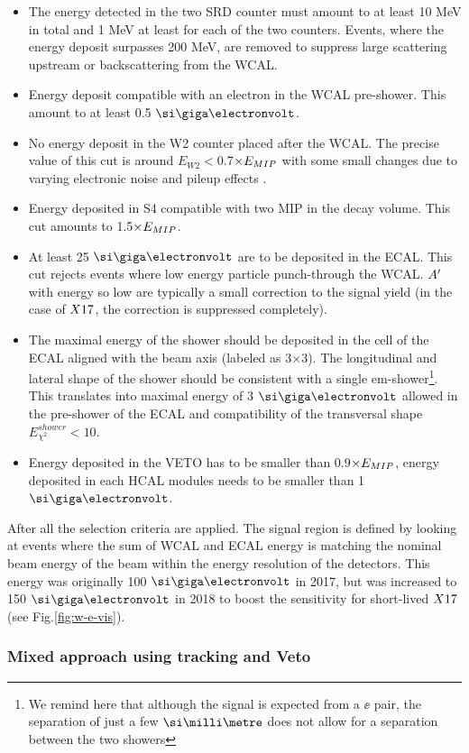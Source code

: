 \begin{itemize}
\item The energy detected in the two SRD counter must amount to at least 10 MeV in total and 1 MeV at least for each of the two counters. Events, where the energy deposit surpasses 200 MeV, are removed to suppress large scattering upstream or backscattering from the WCAL.
\item Energy deposit compatible with an electron in the WCAL pre-shower. This amount to at least 0.5 $\gev$.
\item  No energy deposit in the W2 counter placed after the WCAL. The precise value of this cut is around $E_{W2} < $0.7$\times E_{MIP}$ with some small changes due to varying electronic noise and pileup effects \cite{Banerjee:2019hmi}.
\item Energy deposited in S4 compatible with two MIP in the decay volume. This cut amounts to 1.5$\times E_{MIP}$.
\item At least 25 $\gev$ are to be deposited in the ECAL. This cut rejects events where low energy particle punch-through the WCAL. $A'$ with energy so low are typically a small correction to the signal yield (in the case of $X17$, the correction is suppressed completely).
\item The maximal energy of the shower should be deposited in the cell of the ECAL aligned with the beam axis (labeled as 3$\times$3). The longitudinal and lateral shape of the shower should be consistent with a single em-shower\footnote{We remind here that although the signal is expected from a $\ee$ pair, the separation of just a few $\mmi$ does not allow for a separation between the two showers}. This translates into maximal energy of 3 $\gev$ allowed in the pre-shower of the ECAL and compatibility of the transversal shape $E^{shower}_{\chi^2} < 10$.
\item Energy deposited in the VETO has to be smaller than 0.9$\times E_{MIP}$, energy deposited in each HCAL modules needs to be smaller than 1 $\gev$.
\end{itemize}

After all the selection criteria are applied. The signal region is defined by looking at events where the sum of WCAL and ECAL energy is matching the nominal beam energy of the beam within the energy resolution of the detectors. This energy was originally 100 $\gev$ in 2017, but was increased to 150 $\gev$ in 2018 to boost the sensitivity for short-lived $X17$ (see Fig.\ref{fig:w-e-vis}).

\subsubsection{Mixed approach using tracking and Veto}
\label{ch3:sec:vis-mode-tracking}

